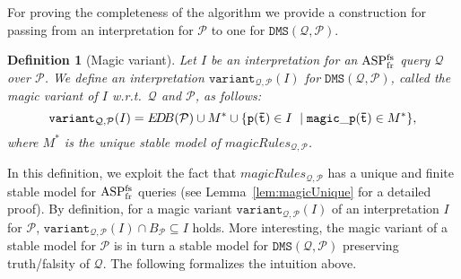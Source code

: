 \documentclass{tlp}
\newcommand{\p}{\ensuremath{{\mathcal{P}}}}
\newcommand{\BP}{\ensuremath{B_{\p}}}
\newtheorem{definition}[theorem]{Definition}
\renewcommand{\P}{\mathcal{P}}
\newcommand{\Q}{\mathcal{Q}}
\newcommand{\magicRules}{\ensuremath{\mathit{magicRules}}}
\newcommand{\dmsqp}{\ensuremath{\DMS(\Q,\p)}}
\newcommand{\variant}[3]{\ensuremath{\mathtt{variant}_{#1,#2}(#3)}}
\newcommand{\variantqpi}{\ensuremath{\variant{\Q}{\p}{I}}}
\newcommand{\magica}{*}
\newcommand{\DMS}{\ensuremath{\mathtt{DMS}}}
\renewcommand{\t}{\bar t}
\newcommand{\EDB}{\ensuremath{E\!D\!B}\xspace}
\newcommand{\ASPFNFR}{\ensuremath{\rm ASP^{\rm fs}_{\rm fr}}}
\begin{document}
For proving the completeness of the algorithm we provide a construction for passing from an interpretation for $\p$ to one for $\dmsqp$.

\begin{definition}[Magic variant]
\label{def:magic_variant} Let $I$ be an interpretation for an \ASPFNFR{} query $\Q$ over $\p$. We define an interpretation $\variantqpi$ for
$\dmsqp$, called the magic variant of $I$ w.r.t.\ $\Q$ and $\p$, as follows:
$$
\variantqpi = \EDB(\p) \cup M^\magica \cup \{ {\tt p(\t)} \in I \ \mid {\tt magic\_p(\t)} \in M^\magica \},
$$
\noindent
where $M^\magica$ is the unique stable model of \magicRules$_{\Q,\P}$.
\end{definition}

In this definition, we exploit the fact that \magicRules$_{\Q,\P}$ has a unique and finite stable model for \ASPFNFR{} queries (see Lemma~\ref{lem:magicUnique} for a detailed proof).
By definition, for a magic variant $\variantqpi$ of an interpretation $I$ for $\p$, $\variantqpi \cap \BP \subseteq
I$ holds. More interesting, the magic variant of a stable model for $\p$ is in turn a stable model for $\dmsqp$
preserving truth/falsity of $\Q$.
The following formalizes the intuition above.
\end{document}
